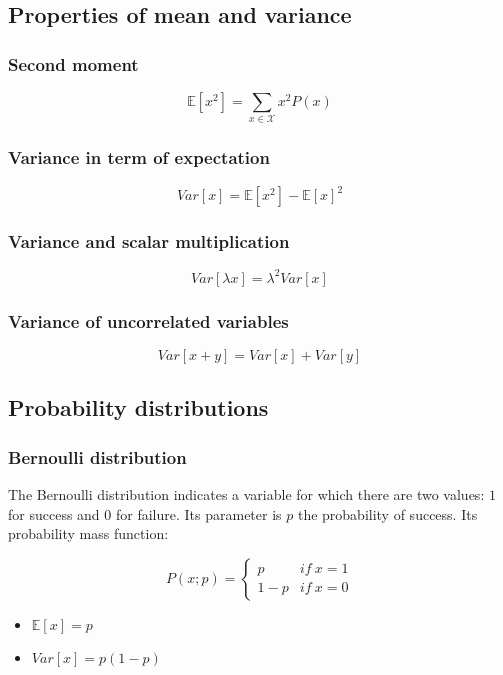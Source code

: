 	\subsection{Properties of mean and variance}

		\subsubsection{Second moment}

		$$\mathbb{E}[x^2] = \sum\limits_{x\in\mathcal{X}}x^2P(x)$$

		\subsubsection{Variance in term of expectation}

		$$Var[x] = \mathbb{E}[x^2] - \mathbb{E}[x]^2$$

		\subsubsection{Variance and scalar multiplication}

		$$Var[\lambda x] = \lambda^2Var[x]$$

		\subsubsection{Variance of uncorrelated variables}

		$$Var[x+y] = Var[x] + Var[y]$$

	\subsection{Probability distributions}

		\subsubsection{Bernoulli distribution}
		The Bernoulli distribution indicates a variable for which there are two values: $1$ for success and $0$ for failure.
		Its parameter is $p$ the probability of success.
		Its probability mass function:

		$$P(x;p) = \begin{cases} p & if\ x = 1\\ 1-p &if\ x = 0\end{cases}$$

		\begin{multicols}{2}
			\begin{itemize}
				\item $\mathbb{E}[x] = p$
				\item $Var[x] = p(1-p)$
			\end{itemize}
		\end{multicols}

